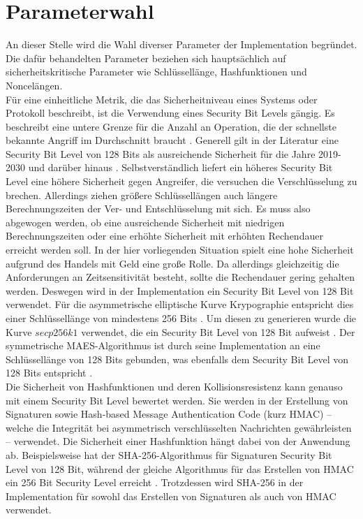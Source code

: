 \documentclass[
	fontsize=12pt,
	headings=small,
	parskip=half,           %
	bibliography=totoc,
	numbers=noenddot,       %
	open=any,               %
]{scrreprt}
\begin{document}
\section{Parameterwahl}
An dieser Stelle wird die Wahl diverser Parameter der Implementation begründet. Die dafür behandelten Parameter beziehen sich hauptsächlich auf sicherheitskritische Parameter wie Schlüssellänge, Hashfunktionen und Noncelängen.\\
Für eine einheitliche Metrik, die das Sicherheitniveau eines Systems oder Protokoll beschreibt, ist die Verwendung eines Security Bit Levels gängig. Es beschreibt eine untere Grenze für die Anzahl an Operation, die der schnellste bekannte Angriff im Durchschnitt braucht \cite{ecc-hankerson2021nist}. Generell gilt in der Literatur eine Security Bit Level von 128 Bits als ausreichende Sicherheit für die Jahre 2019-2030 und darüber hinaus \cite{elaine2016recommendation}. Selbstverständlich liefert ein höheres Security Bit Level eine höhere Sicherheit gegen Angreifer, die versuchen die Verschlüsselung zu brechen. Allerdings ziehen größere Schlüssellängen auch längere Berechnungszeiten der Ver- und Entschlüsselung mit sich. Es muss also abgewogen werden, ob eine ausreichende Sicherheit mit niedrigen Berechnungszeiten oder eine erhöhte Sicherheit mit erhöhten Rechendauer erreicht werden soll. In der hier vorliegenden Situation spielt eine hohe Sicherheit aufgrund des Handels mit Geld eine große Rolle. Da allerdings gleichzeitig die Anforderungen an Zeitsensitivität besteht, sollte die Rechendauer gering gehalten werden. Deswegen wird in der Implementation ein Security Bit Level von 128 Bit verwendet. Für die asymmetrische elliptische Kurve Krypographie entspricht dies einer Schlüssellänge von mindestens 256 Bits \cite{elaine2016recommendation,bsi2020cryptographic}. Um diesen zu generieren wurde die Kurve $secp256k1$ verwendet, die ein Security Bit Level von 128 Bit aufweist \cite{ecc-duka2020elliptic}. Der symmetrische MAES-Algorithmus ist durch seine Implementation an eine Schlüssellänge von 128 Bits gebunden, was ebenfalls dem Security Bit Level von 128 Bits entspricht \cite{elaine2016recommendation}.\\

Die Sicherheit von Hashfunktionen und deren Kollisionsresistenz kann genauso mit einem Security Bit Level bewertet werden. Sie werden in der Erstellung von Signaturen sowie Hash-based Message Authentication Code (kurz HMAC) -- welche die Integrität bei asymmetrisch verschlüsselten Nachrichten gewährleisten -- verwendet. Die Sicherheit einer Hashfunktion hängt dabei von der Anwendung ab. Beispielsweise hat der SHA-256-Algorithmus für Signaturen Security Bit Level von 128 Bit, während der gleiche Algorithmus für das Erstellen von HMAC ein 256 Bit Security Level erreicht \cite{elaine2016recommendation}. Trotzdessen wird SHA-256 in der Implementation für sowohl das Erstellen von Signaturen als auch von HMAC verwendet.\\
\end{document}
